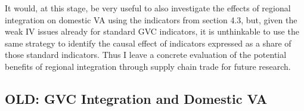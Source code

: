 \documentclass[a4paper]{article}
\begin{document}

It would, at this stage, be very useful to also investigate the effects of regional integration on domestic VA using the indicators from section 4.3, but, given the weak IV issues already for standard GVC indicators, it is unthinkable to use the same strategy to identify the causal effect of indicators expressed as a share of those standard indicators. Thus I leave a concrete evaluation of the potential benefits of regional integration through supply chain trade for future research. 







\subsection{OLD: GVC Integration and Domestic VA}
\end{document}
